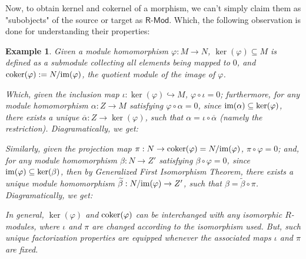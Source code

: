 \documentclass[x11names,reqno,12pt]{extarticle}
\newtheorem{exm}{Example}
\newcommand{\coker}{\textmd{coker}}
\newcommand{\cat}[1]{\textsf{#1}}
\begin{document}
\hfill

Now, to obtain kernel and cokernel of a morphism, we can't simply claim them as "subobjects" of the source or target as $\cat{R-Mod}$. Which, the following observation is done for understanding their properties:
\begin{exm}
    Given a module homomorphism $\varphi:M\rightarrow N$, $\ker(\varphi) \subseteq M$ is defined as a submodule collecting all elements being mapped to $0$, and $\coker(\varphi) := N/\textmd{im}(\varphi)$, the quotient module of the image of $\varphi$.

    Which, given the inclusion map $\iota:\ker(\varphi)\hookrightarrow M$, $\varphi\circ \iota = 0$; furthermore, for any module homomorphism $\alpha:Z\rightarrow M$ satisfying $\varphi\circ \alpha = 0$, since $\textmd{im}(\alpha) \subseteq \ker(\varphi)$, there exists a unique $\overline{\alpha}:Z\rightarrow \ker(\varphi)$, such that $\alpha = \iota\circ \overline{\alpha}$ (namely the restriction). Diagramatically, we get:
    \begin{center}
    \end{center}

    Similarly, given the projection map $\pi:N\rightarrow \coker(\varphi) = N/\textmd{im}(\varphi)$, $\pi\circ \varphi = 0$; and, for any module homomorphism $\beta:N\rightarrow Z'$ satisfying $\beta\circ\varphi = 0$, since $\textmd{im}(\varphi)\subseteq \ker(\beta)$, then by Generalized First Isomorphism Theorem, there exists a unique module homomorphism $\tilde{\beta}:N/\textmd{im}(\varphi)\rightarrow Z'$, such that $\beta=\tilde{\beta}\circ \pi$. Diagramatically, we get:
    \begin{center}
    \end{center}

    In general, $\ker(\varphi)$ and $\coker(\varphi)$ can be interchanged with any isomorphic $R$-modules, where $\iota$ and $\pi$ are changed according to the isomorphism used. But, such unique factorization properties are equipped whenever the associated maps $\iota$ and $\pi$ are fixed.
\end{exm}
\end{document}
